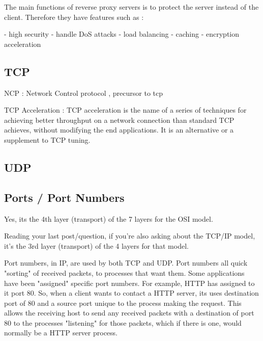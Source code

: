 The main functions of reverse proxy servers is to protect the server instead of
the client. Therefore they have features such as :

- high security
- handle DoS attacks
- load balancing
- caching
- encryption acceleration

\subsectionend

\subsection{TCP}
\label{ssec:tcp}

NCP : Network Control protocol , precursor to tcp

TCP Acceleration : TCP acceleration is the name of a series of techniques for
achieving better throughput on a network connection than standard TCP achieves,
without modifying the end applications. It is an alternative or a supplement to
TCP tuning. 

\subsectionend

\subsection{UDP}
\label{ssec:udp}


\subsectionend

\subsection{Ports / Port Numbers}
\label{ssec:ports_port_numbers}

Yes, its the 4th layer (transport) of the 7 layers for the OSI model.

Reading your last post/question, if you're also asking about the TCP/IP model,
it's the 3rd layer (transport) of the 4 layers for that model.

Port numbers, in IP, are used by both TCP and UDP. Port numbers all quick
"sorting" of received packets, to processes that want them. Some applications
have been "assigned" specific port numbers. For example, HTTP has assigned to it
port 80. So, when a client wants to contact a HTTP server, its uses destination
port of 80 and a source port unique to the process making the request. This
allows the receiving host to send any received packets with a destination of
port 80 to the processes "listening" for those packets, which if there is one,
would normally be a HTTP server process.


